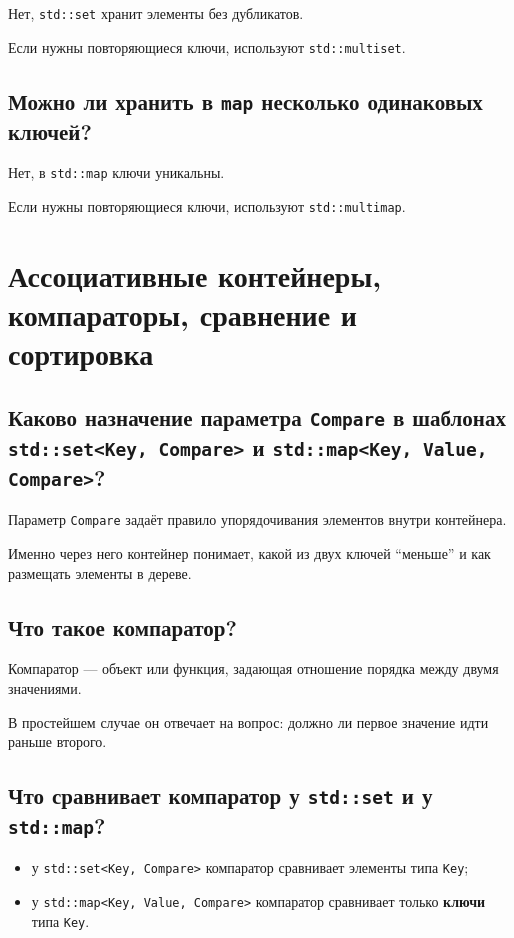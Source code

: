 Нет, \texttt{std::set} хранит элементы без дубликатов.

Если нужны повторяющиеся ключи, используют \texttt{std::multiset}.


\subsection{Можно ли хранить в \texttt{map} несколько одинаковых ключей?}

Нет, в \texttt{std::map} ключи уникальны.

Если нужны повторяющиеся ключи, используют \texttt{std::multimap}.



\section{Ассоциативные контейнеры, компараторы, сравнение и сортировка}

\subsection{Каково назначение параметра \texttt{Compare} в шаблонах \texttt{std::set<Key, Compare>} и \texttt{std::map<Key, Value, Compare>}?}

Параметр \texttt{Compare} задаёт правило упорядочивания элементов внутри контейнера.

Именно через него контейнер понимает, какой из двух ключей ``меньше'' и как размещать элементы в дереве.


\subsection{Что такое компаратор?}

Компаратор --- объект или функция, задающая отношение порядка между двумя значениями.

В простейшем случае он отвечает на вопрос: должно ли первое значение идти раньше второго.


\subsection{Что сравнивает компаратор у \texttt{std::set} и у \texttt{std::map}?}

\begin{itemize}
    \item у \texttt{std::set<Key, Compare>} компаратор сравнивает элементы типа \texttt{Key};
    \item у \texttt{std::map<Key, Value, Compare>} компаратор сравнивает только \textbf{ключи} типа \texttt{Key}.
\end{itemize}


